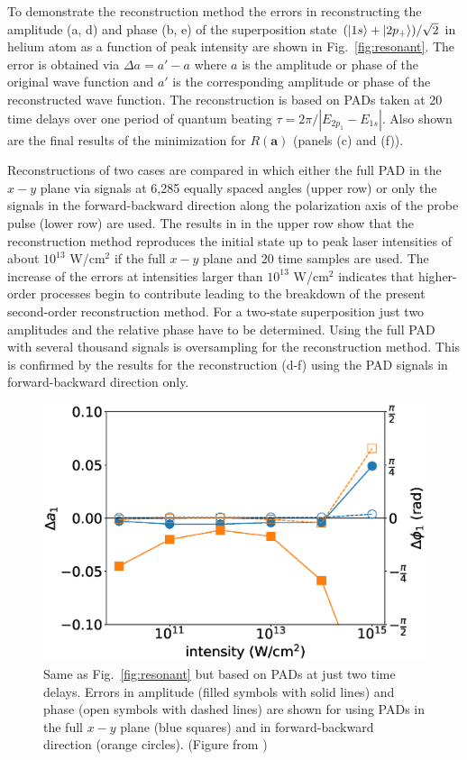 To demonstrate the reconstruction method the errors in reconstructing the amplitude (a, d) and phase (b, e) of the superposition state $(\ket{1s}+\ket{2p_+})/\sqrt{2}$ in helium atom as a function of peak intensity are shown in Fig.~\ref{fig:resonant}. The error is obtained via $\Delta a = a'-a$ where $a$ is the amplitude or phase of the original wave function and $a'$ is the corresponding amplitude or phase of the reconstructed wave function. The reconstruction is based on PADs taken at 20 time delays over one period of quantum beating $\tau = 2\pi / |E_{2p_1}-E_{1s}|$. Also shown are the final results of the minimization for $R(\mathbf{a})$  (panels (c) and (f)).

 Reconstructions of two cases are compared in which either the full PAD in the $x-y$ plane via signals at 6,285 equally spaced angles  (upper row) or only the signals in the forward-backward direction along the polarization axis of the probe pulse  (lower row) are used. The results in in the upper row show that  the reconstruction method reproduces the initial state up to peak laser intensities of about $10^{13}$ W/cm$^2$ if the full $x-y$ plane and 20 time samples are used. The increase of the errors at intensities larger than $10^{13}$ W/cm$^2$ indicates that higher-order processes  begin to contribute leading to the breakdown of the present second-order reconstruction method. For a two-state superposition just two amplitudes and the relative phase have to be determined. Using the full PAD with several thousand signals is oversampling for the reconstruction method. 
This is confirmed by the results for the reconstruction (d-f) using the PAD signals in forward-backward direction only. 

\begin{figure}[!ht]
\centering
\includegraphics[width=0.5\linewidth]{figs/Photo_ionization/superpositions/Venzke_new_fig_4.eps}
\caption{
Same as Fig.\ \ref{fig:resonant} but based on PADs at just two time delays. Errors in amplitude (filled symbols with solid lines) and phase (open symbols with dashed lines) are shown for using PADs in the full $x-y$ plane (blue squares) and in forward-backward direction (orange circles). (Figure from \cite{venzke2021_wave})
} 
  \label{fig:twosamples}
\end{figure}

